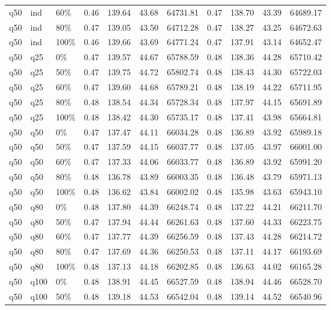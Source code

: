 \begin{longtable}{lllrrrrrrrr}
  q50 & ind & 60\% & 0.46 & 139.64 & 43.68 & 64731.81 & 0.47 & 138.70 & 43.39 & 64689.17 \\ 
  q50 & ind & 80\% & 0.47 & 139.05 & 43.50 & 64712.28 & 0.47 & 138.27 & 43.25 & 64672.63 \\ 
  q50 & ind & 100\% & 0.46 & 139.66 & 43.69 & 64771.24 & 0.47 & 137.91 & 43.14 & 64652.47 \\ 
  q50 & q25 & 0\% & 0.47 & 139.57 & 44.67 & 65788.59 & 0.48 & 138.36 & 44.28 & 65710.42 \\ 
  q50 & q25 & 50\% & 0.47 & 139.75 & 44.72 & 65802.74 & 0.48 & 138.43 & 44.30 & 65722.03 \\ 
  q50 & q25 & 60\% & 0.47 & 139.60 & 44.68 & 65789.21 & 0.48 & 138.19 & 44.22 & 65711.95 \\ 
  q50 & q25 & 80\% & 0.48 & 138.54 & 44.34 & 65728.34 & 0.48 & 137.97 & 44.15 & 65691.89 \\ 
  q50 & q25 & 100\% & 0.48 & 138.42 & 44.30 & 65735.17 & 0.48 & 137.41 & 43.98 & 65664.81 \\ 
  q50 & q50 & 0\% & 0.47 & 137.47 & 44.11 & 66034.28 & 0.48 & 136.89 & 43.92 & 65989.18 \\ 
  q50 & q50 & 50\% & 0.47 & 137.59 & 44.15 & 66037.77 & 0.48 & 137.05 & 43.97 & 66001.00 \\ 
  q50 & q50 & 60\% & 0.47 & 137.33 & 44.06 & 66033.77 & 0.48 & 136.89 & 43.92 & 65991.20 \\ 
  q50 & q50 & 80\% & 0.48 & 136.78 & 43.89 & 66003.35 & 0.48 & 136.48 & 43.79 & 65971.13 \\ 
  q50 & q50 & 100\% & 0.48 & 136.62 & 43.84 & 66002.02 & 0.48 & 135.98 & 43.63 & 65943.10 \\ 
  q50 & q80 & 0\% & 0.48 & 137.80 & 44.39 & 66248.74 & 0.48 & 137.22 & 44.21 & 66211.70 \\ 
  q50 & q80 & 50\% & 0.47 & 137.94 & 44.44 & 66261.63 & 0.48 & 137.60 & 44.33 & 66223.75 \\ 
  q50 & q80 & 60\% & 0.47 & 137.77 & 44.39 & 66256.59 & 0.48 & 137.43 & 44.28 & 66214.72 \\ 
  q50 & q80 & 80\% & 0.47 & 137.69 & 44.36 & 66250.53 & 0.48 & 137.11 & 44.17 & 66193.69 \\ 
  q50 & q80 & 100\% & 0.48 & 137.13 & 44.18 & 66202.85 & 0.48 & 136.63 & 44.02 & 66165.28 \\ 
  q50 & q100 & 0\% & 0.48 & 138.91 & 44.45 & 66527.59 & 0.48 & 138.94 & 44.46 & 66528.70 \\ 
  q50 & q100 & 50\% & 0.48 & 139.18 & 44.53 & 66542.04 & 0.48 & 139.14 & 44.52 & 66540.96 \\ 

\end{longtable}

